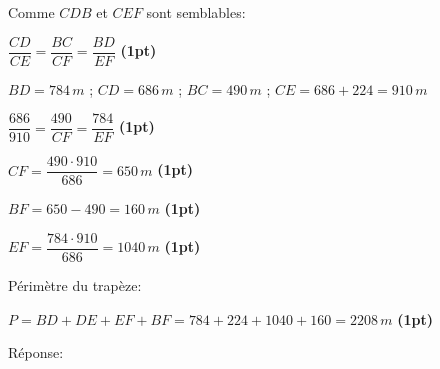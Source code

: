 \begin{parts}
\begin{solutionorgrid}[500pt]
	Comme $CDB$ et $CEF$ sont semblables: 
	
	\vspace{10pt}
	$\dfrac{CD}{CE} = \dfrac{BC}{CF} = \dfrac{BD}{EF}$ \hfill \textbf{(1pt)}
	
	\vspace{10pt}
	$BD = 784\,m$ ; $CD = 686\,m$ ; $BC = 490\,m$ ; $CE = 686 + 224 = 910\,m$ 
	
	\vspace{5pt}
	$\dfrac{686}{910} = \dfrac{490}{CF} = \dfrac{784}{EF}$ \hfill \textbf{(1pt)}
	
	\vspace{5pt}
	$CF = \dfrac{490 \cdot 910}{686} = 650\,m$ \hfill \textbf{(1pt)}
	
	\vspace{5pt}
	$BF = 650 - 490 = 160\,m$ \hfill \textbf{(1pt)}
	
	\vspace{10pt}
	$EF = \dfrac{784 \cdot 910}{686} = 1040\,m$ \hfill \textbf{(1pt)}
	
	\vspace{20pt}
	Périmètre du trapèze: 
	
	\vspace{5pt}
	$P = BD + DE + EF + BF = 784 + 224 + 1040 + 160 = 2208\,m$ \hfill \textbf{(1pt)}
	\end{solutionorgrid}

\begin{tcolorbox}[enhanced jigsaw, interior hidden, colframe=box, parbox=false]%
Réponse: 
\end{tcolorbox}		
\end{parts}